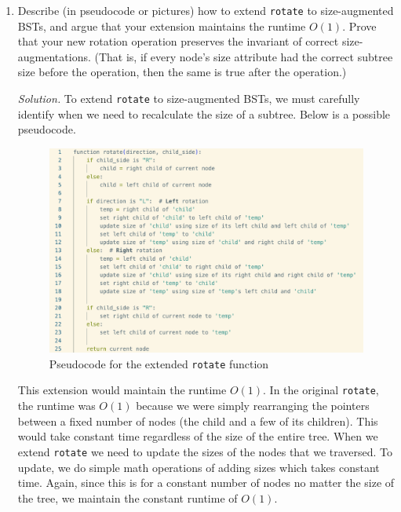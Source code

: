 \documentclass[11pt]{article}
\begin{document}
\begin{enumerate}
\begin{enumerate}
\begin{enumerate}
            \end{enumerate}

        \item Describe (in pseudocode or pictures) how to extend \texttt{rotate} to size-augmented BSTs, and argue that your extension maintains the runtime $O(1)$. Prove that your new rotation operation preserves the invariant of correct size-augmentations. (That is, if every node's size attribute had the correct subtree size before the operation, then the same is true after the operation.)
        
        \textit{Solution.} To extend \texttt{rotate} to size-augmented BSTs, we must carefully identify when we need to recalculate the size of a subtree. Below is a possible pseudocode.
        \begin{figure}[H]
            \centering
            \includegraphics[width=\linewidth]{pseudocode.png}  %
            \caption{Pseudocode for the extended \texttt{rotate} function}
            \label{fig:pseudocode}
        \end{figure}
        This extension would maintain the runtime $O(1).$ In the original \texttt{rotate}, the runtime was $O(1)$ because we were simply rearranging the pointers between a fixed number of nodes (the child and a few of its children). This would take constant time regardless of the size of the entire tree. When we extend \texttt{rotate} we need to update the sizes of the nodes that we traversed. To update, we do simple math operations of adding sizes which takes constant time. Again, since this is for a constant number of nodes no matter the size of the tree, we maintain the constant runtime of $O(1)$. \\


\end{enumerate}
\end{enumerate}
\end{document}
